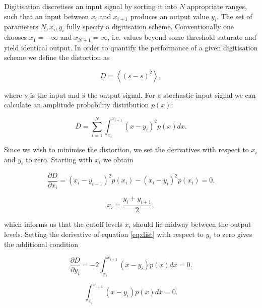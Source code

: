 \documentclass[apj]{emulateapj}
\begin{document}
Digitisation discretises an input signal by sorting it into $N$ appropriate ranges, such that an input between $x_i$ and $x_{i+1}$ produces an output value $y_i$. The set of parameters $N, x_i, y_i$ fully specify a digitisation scheme. Conventionally one chooses $x_{1} = -\infty$ and $x_{N+1} = \infty$, i.e. values beyond some threshold saturate and yield identical output. In order to quantify the performance of a given digitisation scheme we define the distortion as

\begin{equation}\label{eq:distdef}
D = \left\langle  \left( s - \hat{s} \right)^2 \right\rangle,
\end{equation}

where $s$ is the input and $\hat{s}$ the output signal. For a stochastic input signal we can calculate an amplitude probability distribution $p(x)$:

\begin{equation} \label{eq:dist}
D = \sum_{i = 1}^N \int_{x_i}^{x_{i+1}} \left(x-y_i\right)^2 p(x) dx.
\end{equation}

Since we wish to minimise the distortion, we set the derivatives with respect to $x_i$ and $y_i$ to zero. Starting with $x_i$ we obtain

\begin{equation} \label{eq:distderiv1}
\frac{\partial D}{\partial x_i} = \left(x_i-y_{i-1}\right)^2 p(x_i) - \left(x_i - y_i\right)^2 p(x_i) = 0.
\end{equation}

\begin{equation} \label{eq:digitequalspacecondition}
x_i = \frac{y_i+y_{i+1}}{2},
\end{equation}

which informs us that the cutoff levels $x_i$ should lie midway between the output levels. Setting the derivative of equation \ref{eq:dist} with respect to $y_i$  to zero gives the additional condition

\begin{equation} \label{eq:distderiv2}
\frac{\partial D}{\partial y_i} = -2 \int_{x_i}^{x_{i+1}} \left( x-y_i \right) p(x) dx = 0.
\end{equation}

\begin{equation} \label{eq:digitareacondition}
\int_{x_i}^{x_{i+1}} \left( x-y_i \right) p(x) dx = 0.
\end{equation}
\end{document}
